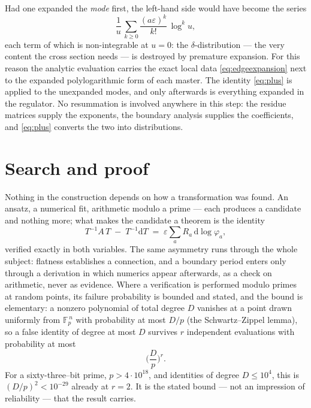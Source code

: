 \documentclass[11pt]{article}
\newcommand{\eps}{\varepsilon}
\newcommand{\dd}{\mathrm{d}}
\newcommand{\Fp}{\mathbb{F}_p}
\begin{document}
Had one expanded the \emph{mode} first, the left-hand side would have
become the series
\begin{equation}
  \frac{1}{u}\,\sum_{k\ge0} \frac{(a\eps)^k}{k!}\,\log^k u ,
\end{equation}
each term of which is non-integrable at $u = 0$: the
$\delta$-distribution --- the very content the cross section needs
--- is destroyed by premature expansion.  For this reason the
analytic evaluation carries the exact local data
\eqref{eq:edgeexpansion} next to the expanded polylogarithmic form of
each master.  The identity \eqref{eq:plus} is applied to the
unexpanded modes, and only afterwards is everything expanded in the
regulator.  No
resummation is involved anywhere in this step: the residue matrices
supply the exponents, the boundary analysis supplies the
coefficients, and \eqref{eq:plus} converts the two into
distributions.

\section{Search and proof}
\label{sec:proof}

Nothing in the construction depends on how a transformation was
found.  An ansatz, a numerical fit, arithmetic modulo a prime ---
each produces a candidate and nothing more; what makes the candidate
a theorem is the identity
\begin{equation}
  T^{-1} A\, T \;-\; T^{-1}\dd T
  \;=\; \eps \sum_a R_a\,\dd\log\varphi_a ,
  \label{eq:canonicalid}
\end{equation}
verified exactly in both variables.  The same asymmetry runs through
the whole subject: flatness establishes a connection, and a boundary
period enters only through a derivation in which numerics appear
afterwards, as a check on arithmetic, never as evidence.  Where a
verification is performed modulo primes at random points, its
failure probability is bounded and stated, and the bound is
elementary: a nonzero polynomial of total degree $D$ vanishes at a
point drawn uniformly from $\Fp^{\,n}$ with probability at most
$D/p$ (the Schwartz--Zippel lemma), so a false identity of degree
at most $D$ survives $r$ independent evaluations with probability
at most
\begin{equation}
  \Big(\frac{D}{p}\Big)^{\!r} .
\end{equation}
For a sixty-three--bit prime, $p > 4\cdot 10^{18}$, and identities of
degree $D \le 10^4$, this is $(D/p)^2 < 10^{-29}$ already at
$r = 2$.  It is the stated bound --- not an impression of
reliability --- that the result carries.
\end{document}
